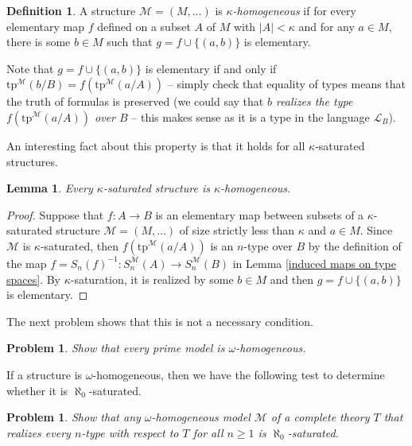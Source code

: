 \documentclass[10pt]{amsart}
\renewcommand{\L}{\mathcal{L}}
\newcommand{\MM}{\mathcal{M}}
\newcommand{\tp}{\mathrm{tp}}
\newtheorem{lemma}[theorem]{Lemma}
\newtheorem{problem}[theorem]{Problem}
\theoremstyle{definition}
\newtheorem{definition}[theorem]{Definition}
\theoremstyle{remark}
\begin{document}
\begin{definition} 
A structure $\MM=(M,\dots)$ is \emph{$\kappa$-homogeneous} if for every elementary map $f$ defined on a subset $A$ of $M$ with $|A|<\kappa$ and for any $a \in M$, there is some $b\in M$ such that $g = f\cup \{(a,b)\}$ is elementary. 
\end{definition} 

Note that $g = f\cup \{(a,b)\}$ is elementary if and only if $\tp^\MM(b/B)=f(\tp^\MM(a/A))$ -- simply check that equality of types means that the truth of formulas is preserved (we could say that \emph{$b$ realizes the type $f(\tp^\MM(a/A))$ over $B$} -- this makes sense as it is a type in the language $\L_B$). 

An interesting fact about this property is that it holds for all $\kappa$-saturated structures. 

\begin{lemma} \label{saturated structures are homogeneous} 
Every $\kappa$-saturated structure is $\kappa$-homogeneous. 
\end{lemma} 
\begin{proof} 
Suppose that $f\colon A\rightarrow B$ is an elementary map between subsets of a $\kappa$-saturated structure $\MM=(M,\dots)$ of size strictly less than $\kappa$ and $a\in M$. Since $\MM$ is $\kappa$-saturated, then $f(\tp^\MM(a/A))$ is an $n$-type over $B$ by the definition of the map $f=S_n(f)^{-1}\colon S_n^\MM(A)\rightarrow S_n^\MM(B)$ in Lemma \ref{induced maps on type spaces}. By $\kappa$-saturation, it is realized by some $b\in M$ and then $g = f\cup \{(a,b)\}$ is elementary. 
\end{proof} 

The next problem shows that this is not a necessary condition. 

\begin{problem} \label{prime models are omega-homogeneous} 
Show that every prime model is $\omega$-homogeneous. 
\end{problem} 

If a structure is $\omega$-homogeneous, then we have the following test to determine whether it is $\aleph_0$-saturated. 

\begin{problem} 
Show that any $\omega$-homogeneous model $\MM$ of a complete theory $T$ that realizes every $n$-type with respect to $T$ for all $n\geq1$ is $\aleph_0$-saturated. 
\end{problem} 

\end{document}
